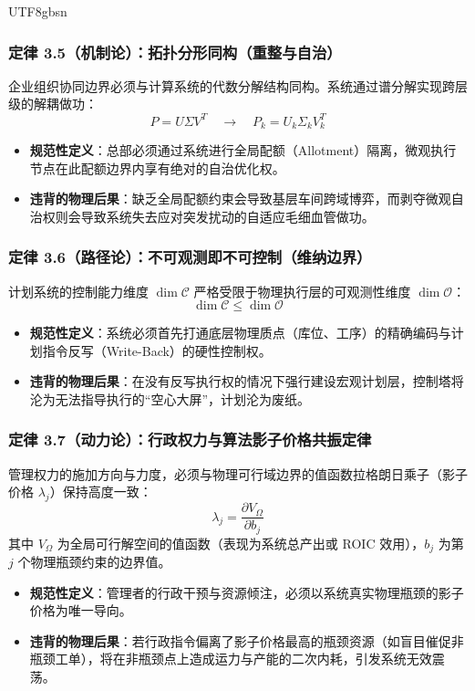 \documentclass[11pt,a4paper]{article}
\begin{document}
\begin{CJK*}{UTF8}{gbsn}
\subsubsection{定律 3.5（机制论）：拓扑分形同构（重整与自治）}
企业组织协同边界必须与计算系统的代数分解结构同构。系统通过谱分解实现跨层级的解耦做功：
$$P = U \Sigma V^T \quad \to \quad P_k = U_k \Sigma_k V_k^T$$
\begin{itemize}
    \item \textbf{规范性定义}：总部必须通过系统进行全局配额（Allotment）隔离，微观执行节点在此配额边界内享有绝对的自治优化权。
    \item \textbf{违背的物理后果}：缺乏全局配额约束会导致基层车间跨域博弈，而剥夺微观自治权则会导致系统失去应对突发扰动的自适应毛细血管做功。
\end{itemize}

\subsubsection{定律 3.6（路径论）：不可观测即不可控制（维纳边界）}
计划系统的控制能力维度 $\dim \mathcal{C}$ 严格受限于物理执行层的可观测性维度 $\dim \mathcal{O}$：
$$\dim \mathcal{C} \le \dim \mathcal{O}$$
\begin{itemize}
    \item \textbf{规范性定义}：系统必须首先打通底层物理质点（库位、工序）的精确编码与计划指令反写（Write-Back）的硬性控制权。
    \item \textbf{违背的物理后果}：在没有反写执行权的情况下强行建设宏观计划层，控制塔将沦为无法指导执行的“空心大屏”，计划沦为废纸。
\end{itemize}

\subsubsection{定律 3.7（动力论）：行政权力与算法影子价格共振定律}
管理权力的施加方向与力度，必须与物理可行域边界的值函数拉格朗日乘子（影子价格 $\lambda_j$）保持高度一致：
$$\lambda_j = \frac{\partial V_{\Omega}}{\partial b_j}$$
其中 $V_{\Omega}$ 为全局可行解空间的值函数（表现为系统总产出或 ROIC 效用），$b_j$ 为第 $j$ 个物理瓶颈约束的边界值。
\begin{itemize}
    \item \textbf{规范性定义}：管理者的行政干预与资源倾注，必须以系统真实物理瓶颈的影子价格为唯一导向。
    \item \textbf{违背的物理后果}：若行政指令偏离了影子价格最高的瓶颈资源（如盲目催促非瓶颈工单），将在非瓶颈点上造成运力与产能的二次内耗，引发系统无效震荡。
\end{itemize}


\end{CJK*}
\end{document}
